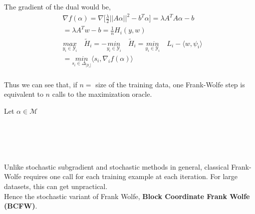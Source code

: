 The gradient of the dual would be,
\begin{align*}
    &\nabla f(\alpha)= \nabla\Big[\frac{\lambda}{2}||A\alpha||^{2}- b^{T}\alpha\Big] = \lambda A^{T}A\alpha- b\\
    &= \lambda A^{T}w- b= \frac{1}{n}H_{i}(y,w)\\
    &\underset{y_{i}\in\mathcal{Y}_{i}}{\textit{max}}\quad\tilde{H}_{i}=
  -\underset{y_{i}\in\mathcal{Y}_{i}}{\textit{min}}\quad\tilde{H}_{i} =
  \underset{y_{i}\in\mathcal{Y}_{i}}{\textit{min}}\quad L_{i}- \langle w,
  \psi_{i}\rangle\\ &=
  \underset{s_{i}\in\Delta_{|\mathcal{Y}_{i}|}}{\textit{min}}\langle s_{i},
  \nabla_{i} f(\alpha)\rangle\\
\end{align*}

Thus we can see that, if $n=$ size of the training data, one Frank-Wolfe step is
equivalent to $n$ calls to the maximization oracle.
\begin{algorithmic}
   \STATE Let $\alpha\in\mathcal{M}$
    \\
        \\
        \\
        \\
        \\
      \ENDFOR
   \ENDFOR
\end{algorithmic}

Unlike stochastic subgradient and stochastic methods in general, classical
Frank-Wolfe requires one call for each training example at each iteration. For
large datasets, this can get unpractical.\\ Hence the stochastic variant of
Frank Wolfe, \textbf{Block Coordinate Frank Wolfe (BCFW)}.\\




